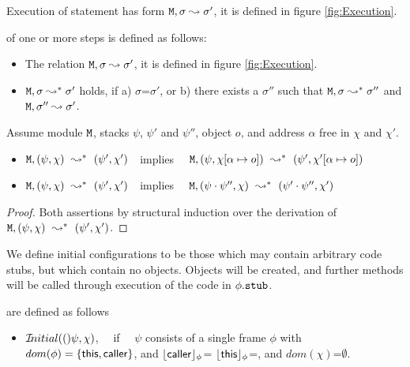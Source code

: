 Execution of statement has   form ${\mbox{\tt{\ensuremath{{\mbox{\tt{M}}}}}}}, \sigma \leadsto \sigma'$, it is defined in figure \ref{fig:Execution}.

\begin{definition}[Execution] of one or more steps is defined as follows:

\begin{itemize}
     \item 
   The relation ${\mbox{\tt{\ensuremath{{\mbox{\tt{M}}}}}}}, \sigma \leadsto \sigma'$, it is defined in figure \ref{fig:Execution}.
   \item
   ${\mbox{\tt{\ensuremath{{\mbox{\tt{M}}}}}}}, \sigma \leadsto^* \sigma'$ holds, if a) $\sigma$=$\sigma'$, or b) there exists a $\sigma''$ such that
   ${\mbox{\tt{\ensuremath{{\mbox{\tt{M}}}}}}}, \sigma \leadsto^* \sigma''$ and ${\mbox{\tt{\ensuremath{{\mbox{\tt{M}}}}}}}, \sigma'' \leadsto \sigma'$.
 \end{itemize}

\end{definition}

\begin{lemma}
Assume module ${\mbox{\tt{\ensuremath{{\mbox{\tt{M}}}}}}}$, stacks $\psi$, $\psi'$ and $\psi''$,  object $o$, and address $\alpha$  free in $\chi$ and $\chi'$.
\begin{itemize}
     \item 
   $\M, (\psi,\chi) \ \leadsto^*\ (\psi',\chi')$\ \ implies    \ \ ${\mbox{\tt{\ensuremath{{\mbox{\tt{M}}}}}}}, (\psi,\chi[\alpha\mapsto o])\ \leadsto^*\ (\psi',\chi'[\alpha\mapsto o])$
   \item
    $\M, (\psi,\chi) \ \leadsto^*\ (\psi',\chi')$\ \ implies    \ \ $\M, (\psi\cdot\psi'',\chi)\ \leadsto^*\ (\psi'\cdot\psi'',\chi')$
    \end{itemize}
\end{lemma}

\begin{proof}
Both assertions by structural induction  over the derivation of  $\M, (\psi,\chi) \ \leadsto^*\ (\psi',\chi')$.
\end{proof}

We define initial configurations to be those which may contain arbitrary code stubs, but which contain no objects. Objects will be created, and further methods will be called through execution of the code in $\phi.{\mbox{\tt{stub}}}$.

\begin{definition} are defined as follows \\

\begin{itemize}
     \item 
   ${{\mathcal I}\!nitial}(()\psi,\chi)$, \ \ if \ \ $\psi$ consists of a single frame $\phi$ with $dom(\phi)=\{ {\bf{\sf {this}}}, {\bf{\sf {caller}}} \}$, and ${\lfloor{ {{\bf{\sf {caller}}}}}\rfloor_{\phi}}$= ${\lfloor{ {{\bf{\sf {this}}}}}\rfloor_{\phi}}$=\nullK, and $dom(\chi)$=$\emptyset$.
 \end{itemize}

\end{definition}

